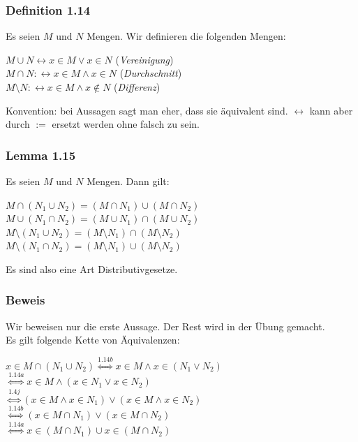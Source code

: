 \documentclass{article}
\begin{document}
\subsubsection*{Definition 1.14}
Es seien $M$ und $N$ Mengen. Wir definieren die folgenden Mengen: 
\begin{center}
    $M \cup N \leftrightarrow x \in M \vee x \in N$ (\textit{Vereinigung}) \\
    $M \cap N :\leftrightarrow x \in M \wedge x \in N$ (\textit{Durchschnitt}) \\
    $M \setminus N :\leftrightarrow x \in M \wedge x \notin N$ (\textit{Differenz}) \\
\end{center}
Konvention: bei Aussagen sagt man eher, dass sie äquivalent sind. $\leftrightarrow$ kann aber durch $:=$ ersetzt werden ohne falsch zu sein. 

\subsubsection*{Lemma 1.15}
Es seien $M$ und $N$ Mengen. Dann gilt: 

\begin{center}
    $M \cap (N_1 \cup N_2) = (M \cap N_1) \cup (M \cap N_2)$ \\
    $M \cup (N_1 \cap N_2) = (M \cup N_1) \cap (M \cup N_2)$ \\
    $M \setminus (N_1 \cup N_2) = (M \setminus N_1) \cap (M \setminus N_2)$ \\
    $M \setminus (N_1 \cap N_2) = (M \setminus N_1) \cup (M \setminus N_2)$ \\
\end{center}
Es sind also eine Art Distributivgesetze. 

\subsubsection*{Beweis}
Wir beweisen nur die erste Aussage. Der Rest wird in der Übung gemacht. \\
Es gilt folgende Kette von Äquivalenzen: 
\begin{center}
    $x \in M \cap (N_1 \cup N_2) \stackrel{1.14b}{\Leftrightarrow} x \in M \wedge x \in (N_1 \vee N_2)$ \\
    $\stackrel{1.14a}{\Leftrightarrow} x \in M \wedge (x \in N_1 \vee x \in N_2)$ \\ 
    $\stackrel{1.4j}{\Leftrightarrow} (x \in M \wedge x \in N_1) \vee (x \in M \wedge x \in N_2)$ \\
    $\stackrel{1.14b}{\Leftrightarrow} (x \in M \cap N_1) \vee (x \in M \cap N_2)$ \\
    $\stackrel{1.14a}{\Leftrightarrow} x \in (M \cap N_1) \cup x \in (M \cap N_2)$ \\
\end{center}
\end{document}
